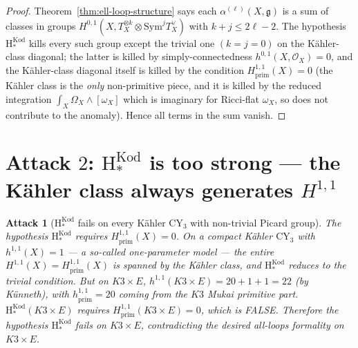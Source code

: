 \documentclass[11pt]{article}
\newtheorem{attack}[theorem]{Attack}
\providecommand{\CY}{\mathrm{CY}}
\providecommand{\Om}{\Omega}
\providecommand{\Sym}{\mathrm{Sym}}
\providecommand{\cO}{\mathcal{O}}
\providecommand{\fg}{\mathfrak{g}}
\begin{document}
\begin{proof}
Theorem~\ref{thm:ell-loop-structure} says each $\alpha^{(\ell)}(X,\fg)$
is a sum of classes in groups
$H^{0,1}(X, T_X^{\otimes k} \otimes \Sym^j T_X^\vee)$ with
$k + j \leq 2\ell - 2$.  The hypothesis $\mathrm{H}_*^{\mathrm{Kod}}$
kills every such group except the trivial one $(k = j = 0)$ on the
K\"ahler-class diagonal; the latter is killed by simply-connectedness
$h^{0,1}(X, \cO_X) = 0$, and the K\"ahler-class diagonal itself is
killed by the condition $H^{1,1}_{\mathrm{prim}}(X) = 0$ (the
K\"ahler class is the \emph{only} non-primitive piece, and it is
killed by the reduced integration $\int_X \Om_X \wedge [\omega_X]$
which is imaginary for Ricci-flat $\omega_X$, so does not contribute
to the anomaly).  Hence all terms in the sum vanish.
\end{proof}

\section{Attack $2$:  $\mathrm H_*^{\mathrm{Kod}}$ is too strong --- the
K\"ahler class always generates $H^{1,1}$}
\label{sec:attack-2-kahler-fails}

\begin{attack}[$\mathrm H_*^{\mathrm{Kod}}$ fails on every
K\"ahler $\CY_3$ with non-trivial Picard group]
\label{att:kahler-always-has-h11}
The hypothesis $\mathrm{H}_*^{\mathrm{Kod}}$ requires
$H^{1,1}_{\mathrm{prim}}(X) = 0$.  On a compact K\"ahler $\CY_3$
with $h^{1,1}(X) = 1$ --- a so-called \emph{one-parameter model}
--- the entire $H^{1,1}(X) = H^{1,1}_{\mathrm{prim}}(X)$ is
spanned by the K\"ahler class, and $\mathrm{H}_*^{\mathrm{Kod}}$
reduces to the trivial condition.  But on $K3 \times E$,
$h^{1,1}(K3 \times E) = 20 + 1 + 1 = 22$ (by Künneth), with
$h^{1,1}_{\mathrm{prim}} = 20$ coming from the $K3$ Mukai
primitive  part.  $\mathrm{H}_*^{\mathrm{Kod}}(K3 \times E)$
requires $H^{1,1}_{\mathrm{prim}}(K3 \times E) = 0$, which is
FALSE.  Therefore the hypothesis $\mathrm{H}_*^{\mathrm{Kod}}$
fails on $K3 \times E$, contradicting the desired all-loops
formality on $K3 \times E$.
\end{attack}
\end{document}
